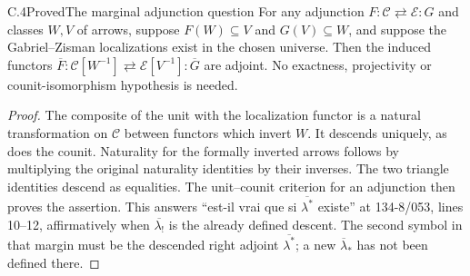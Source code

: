 \begin{claim}{C.4}{Proved}{The marginal adjunction question}\label{C4}
For any adjunction $F:\mathcal C\rightleftarrows\mathcal E:G$ and classes $W,V$ of arrows, suppose $F(W)\subseteq V$ and $G(V)\subseteq W$, and suppose the Gabriel--Zisman localizations exist in the chosen universe. Then the induced functors $\overline F:\mathcal C[W^{-1}]\rightleftarrows\mathcal E[V^{-1}]:\overline G$ are adjoint. No exactness, projectivity or counit-isomorphism hypothesis is needed.
\end{claim}
\begin{proof}
The composite of the unit with the localization functor is a natural transformation on $\mathcal C$ between functors which invert $W$. It descends uniquely, as does the counit. Naturality for the formally inverted arrows follows by multiplying the original naturality identities by their inverses. The two triangle identities descend as equalities. The unit--counit criterion for an adjunction then proves the assertion. This answers ``est-il vrai que si $\overline{\lambda^*}$ existe'' at 134-8/053, lines 10--12, affirmatively when $\overline{\lambda_!}$ is the already defined descent. The second symbol in that margin must be the descended right adjoint $\overline{\lambda^*}$; a new $\overline\lambda_*$ has not been defined there.
\end{proof}

